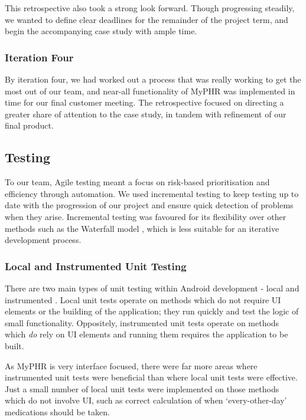 \documentclass{l3proj}
\begin{document}
This retrospective also took a strong look forward. Though progressing steadily, we wanted to define clear deadlines for the remainder of the project term, and begin the accompanying case study with ample time. 


\subsubsection{Iteration Four} \label{sec:3.4.5}
By iteration four, we had worked out a process that was really working to get the most out of our team, and near-all functionality of MyPHR was implemented in time for our final customer meeting. The retrospective focused on directing a greater share of attention to the case study, in tandem with refinement of our final product. 


\subsection{Testing} \label{sec:3.5}
To our team, Agile testing meant a focus on risk-based prioritisation and efficiency through automation. We used incremental testing to keep testing up to date with the progression of our project and ensure quick detection of problems when they arise. Incremental testing was favoured for its flexibility over other methods such as the Waterfall model \cite{Waterfall}, which is less suitable for an iterative development process. 


\subsubsection{Local and Instrumented Unit Testing} \label{sec:3.5.1}
There are two main types of unit testing within Android development - local and instrumented \cite{unit-tests}. Local unit tests operate on methods which do not require UI elements or the building of the application; they run quickly and test the logic of small functionality. Oppositely, instrumented unit tests operate on methods which \textit{do} rely on UI elements and running them requires the application to be built.

As MyPHR is very interface focused, there were far more areas where instrumented unit tests were beneficial than where local unit tests were effective. Just a small number of local unit tests were implemented on those methods which do not involve UI, such as correct calculation of when `every-other-day' medications should be taken.
\end{document}

